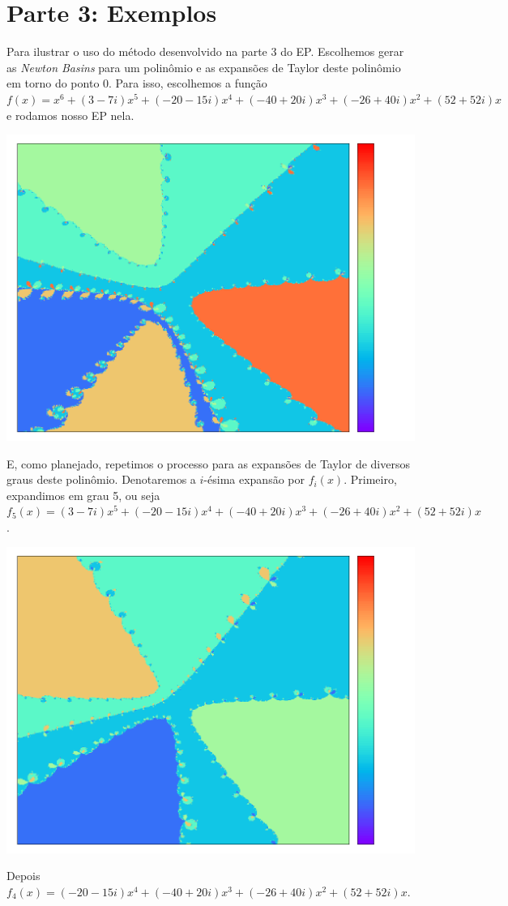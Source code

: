 \documentclass{article}
\begin{document}
\section{Parte 3: Exemplos}

Para ilustrar o uso do método desenvolvido na parte 3 do EP. Escolhemos gerar as \textit{Newton Basins} para um polinômio e as expansões de Taylor deste polinômio em torno do ponto 0. Para isso, escolhemos a função $f(x) = x^6 + (3-7i)x^5 + (-20-15i)x^4 + (-40+20i)x^3 + (-26+40i)x^2 + (52+52i)x$ e rodamos nosso EP nela.  
\begin{center}\includegraphics[width=0.75\columnwidth]{original} \end{center}
E, como planejado, repetimos o processo para as expansões de Taylor de diversos graus deste polinômio. Denotaremos a $i$-ésima expansão por $f_i(x)$. Primeiro, expandimos em grau 5, ou seja $f_5(x) = (3-7i)x^5 + (-20-15i)x^4 + (-40+20i)x^3 + (-26+40i)x^2 + (52+52i)x$.  
\begin{center}\includegraphics[width=0.75\columnwidth]{expand_5} \end{center}
Depois $f_4(x) = (-20-15i)x^4 + (-40+20i)x^3 + (-26+40i)x^2 + (52+52i)x$.  
\end{document}
